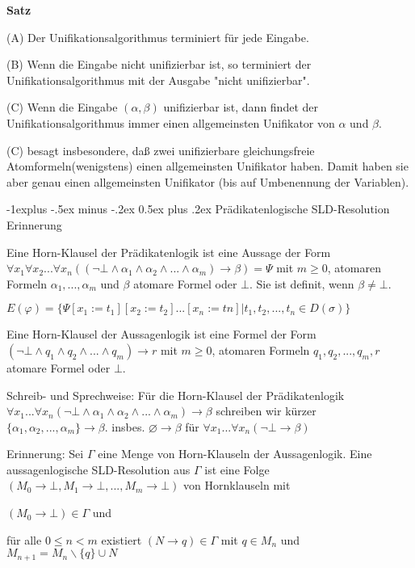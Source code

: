 \documentclass[a4paper]{article}
\makeatletter
\renewcommand{\note}[2]{\begin{noteBox} \textbf{#1} #2 \end{noteBox}}
\renewcommand{\subsection}{\@startsection{subsection}{2}{0mm}%
                {-1explus -.5ex minus -.2ex}%
                {0.5ex plus .2ex}%
                {\normalfont\normalsize\bfseries}}
\makeatother
\begin{document}
\begin{multicols}{3}
  \note{Satz}{
    \begin{itemize*}
      \item (A) Der Unifikationsalgorithmus terminiert für jede Eingabe.
      \item (B) Wenn die Eingabe nicht unifizierbar ist, so terminiert der Unifikationsalgorithmus mit der Ausgabe "nicht unifizierbar".
      \item (C) Wenn die Eingabe $(\alpha,\beta)$ unifizierbar ist, dann findet der Unifikationsalgorithmus immer einen allgemeinsten Unifikator von $\alpha$ und $\beta$.
    \end{itemize*}
  }

  (C) besagt insbesondere, daß zwei unifizierbare gleichungsfreie Atomformeln(wenigstens) einen allgemeinsten Unifikator haben. Damit haben sie aber genau einen allgemeinsten Unifikator (bis auf Umbenennung der Variablen).

  \subsection{Prädikatenlogische SLD-Resolution}
  Erinnerung
  \begin{itemize*}
    \item Eine Horn-Klausel der Prädikatenlogik ist eine Aussage der Form $\forall x_1 \forall x_2... \forall x_n ((\lnot\bot \wedge\alpha_1 \wedge\alpha_2 \wedge...\wedge\alpha_m)\rightarrow\beta)=\Psi$ mit $m\geq 0$, atomaren Formeln $\alpha_1,...,\alpha_m$ und $\beta$ atomare Formel oder $\bot$. Sie ist definit, wenn $\beta\not =\bot$.
    \item $E(\varphi) =\{\Psi[x_1 :=t_1 ][x_2 :=t_2 ]...[x_n:=tn]|t_1 ,t_2 ,...,t_n\in D(\sigma)\}$
    \item Eine Horn-Klausel der Aussagenlogik ist eine Formel der Form $(\lnot\bot\wedge q_1 \wedge q_2 \wedge... \wedge q_m)\rightarrow r$ mit $m\geq 0$, atomaren Formeln $q_1,q_2,...,q_m,r$ atomare Formel oder $\bot$.
  \end{itemize*}

  Schreib- und Sprechweise:
  Für die Horn-Klausel der Prädikatenlogik $\forall x_1...\forall x_n(\lnot\bot \wedge \alpha_1 \wedge \alpha_2 \wedge...\wedge \alpha_m)\rightarrow\beta$ schreiben wir kürzer $\{\alpha_1,\alpha_2,...,\alpha_m\}\rightarrow\beta$.
  insbes. $\varnothing\rightarrow\beta$ für $\forall x_1...\forall x_n(\lnot\bot\rightarrow\beta)$

  Erinnerung:
  Sei $\Gamma$ eine Menge von Horn-Klauseln der Aussagenlogik. Eine aussagenlogische SLD-Resolution aus $\Gamma$ ist eine Folge $(M_0 \rightarrow\bot,M_1 \rightarrow\bot,...,M_m\rightarrow\bot)$ von Hornklauseln mit
  \begin{itemize*}
    \item $(M_0\rightarrow\bot)\in\Gamma$ und
    \item für alle $0\leq n<m$ existiert $(N\rightarrow q)\in\Gamma$ mit $q\in M_n$ und $M_{n+1} =M_n\backslash\{q\}\cup N$
  \end{itemize*}


\end{multicols}
\end{document}
